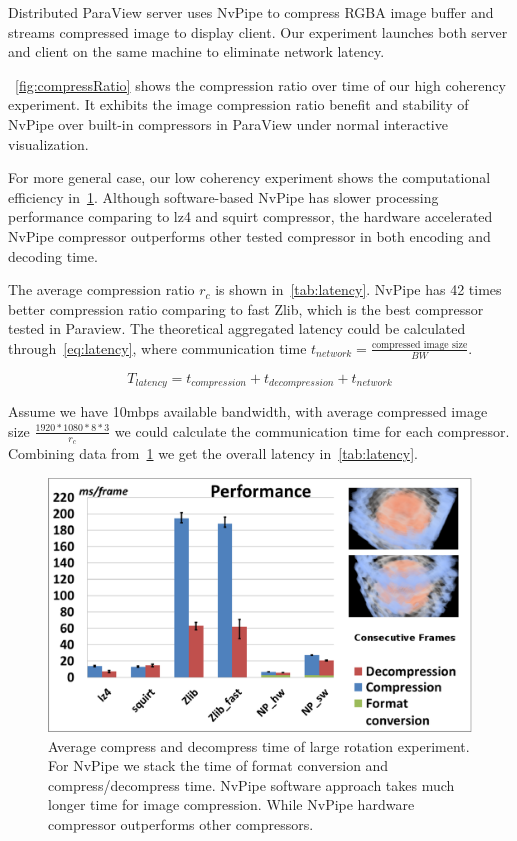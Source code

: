 \documentclass[review]{vgtc}                 %
\begin{document}
Distributed ParaView server uses NvPipe to compress RGBA image buffer and streams compressed image to display client. Our experiment launches both server and client on the same machine to eliminate network latency. 

~\cref{fig:compressRatio} shows the compression ratio over time of our high coherency experiment. It exhibits the image compression ratio benefit and stability of NvPipe over built-in compressors in ParaView under normal interactive visualization.

For more general case, our low coherency experiment shows the computational efficiency in~\cref{fig:time}. Although software-based NvPipe has slower processing performance comparing to lz4 and squirt compressor, the hardware accelerated NvPipe compressor outperforms other tested compressor in both encoding and decoding time.

The average compression ratio \(r_c\) is shown in~\cref{tab:latency}. NvPipe has 42 times better compression ratio comparing to fast Zlib, which is the best compressor tested in Paraview.
The theoretical aggregated latency could be calculated through~\cref{eq:latency}, where communication time \(t_{network}=\frac{\text{compressed image size}}{BW}\). 

\begin{equation}
\label{eq:latency}
T_{latency}=t_{compression}+t_{decompression}+t_{network}
\end{equation}

Assume we have 10mbps available bandwidth, with average compressed image size \(\frac{1920*1080*8*3}{r_c}\) we could calculate the communication time for each compressor. Combining data from~\cref{fig:time} we get the overall latency in~\cref{tab:latency}.

\begin{figure}[t]
  \centering
  \includegraphics[width=\columnwidth]{Performance.eps}
  \caption{ Average compress and decompress time of large rotation experiment. For NvPipe we stack the time of format conversion and compress/decompress time. NvPipe software approach takes much longer time for image compression. While NvPipe hardware compressor outperforms other compressors.}
  \label{fig:time}
\end{figure}
\end{document}
